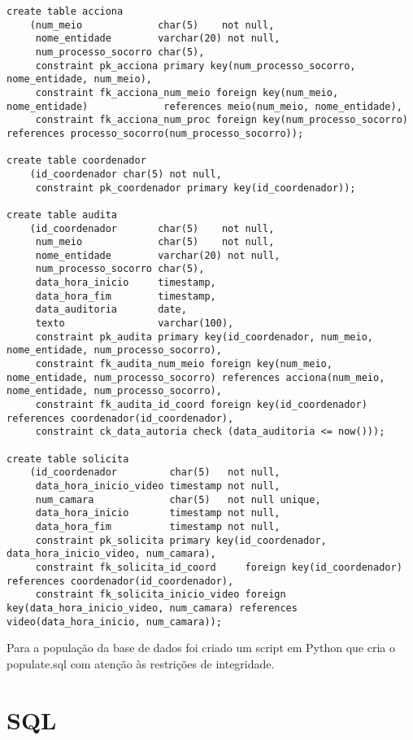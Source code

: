 \documentclass[12pt,a4paper]{article}
\begin{document}
\begin{verbatim}
create table acciona
    (num_meio             char(5)    not null,
     nome_entidade        varchar(20) not null,
     num_processo_socorro char(5),
     constraint pk_acciona primary key(num_processo_socorro, nome_entidade, num_meio),
     constraint fk_acciona_num_meio foreign key(num_meio, nome_entidade)             references meio(num_meio, nome_entidade),
     constraint fk_acciona_num_proc foreign key(num_processo_socorro) references processo_socorro(num_processo_socorro));

create table coordenador
    (id_coordenador char(5) not null,
     constraint pk_coordenador primary key(id_coordenador));

create table audita
    (id_coordenador       char(5)    not null,
     num_meio             char(5)    not null,
     nome_entidade        varchar(20) not null,
     num_processo_socorro char(5),
     data_hora_inicio     timestamp,
     data_hora_fim        timestamp,
     data_auditoria       date,
     texto                varchar(100),
     constraint pk_audita primary key(id_coordenador, num_meio, nome_entidade, num_processo_socorro),
     constraint fk_audita_num_meio foreign key(num_meio, nome_entidade, num_processo_socorro) references acciona(num_meio, nome_entidade, num_processo_socorro),
     constraint fk_audita_id_coord foreign key(id_coordenador) references coordenador(id_coordenador),
     constraint ck_data_autoria check (data_auditoria <= now()));

create table solicita
    (id_coordenador         char(5)   not null,
     data_hora_inicio_video timestamp not null,
     num_camara             char(5)   not null unique,
     data_hora_inicio       timestamp not null,
     data_hora_fim          timestamp not null,
     constraint pk_solicita primary key(id_coordenador, data_hora_inicio_video, num_camara),
     constraint fk_solicita_id_coord     foreign key(id_coordenador) references coordenador(id_coordenador),
     constraint fk_solicita_inicio_video foreign key(data_hora_inicio_video, num_camara) references video(data_hora_inicio, num_camara));

\end{verbatim}

Para a população da base de dados foi criado um script em Python que cria o populate.sql com atenção às restrições de integridade. 

\section{SQL}
\end{document}
